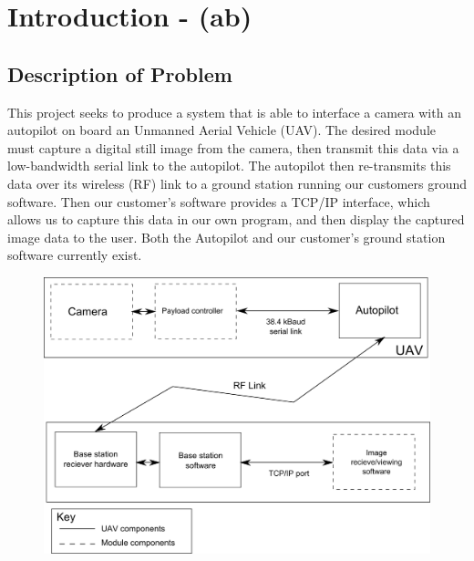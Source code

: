 \chapter{Introduction - (ab)}

\section{Description of Problem}

This project seeks to produce a system that is able to interface a camera with an autopilot on board an Unmanned Aerial Vehicle (UAV). The desired module must capture a digital still image from the camera, then transmit this data via a low-bandwidth serial link to the autopilot. The autopilot then re-transmits this data over its wireless (RF) link to a ground station running our customers ground software. Then our customer's software provides a TCP/IP interface, which allows us to capture this data in our own program, and then display the captured image data to the user. Both the Autopilot and our customer's ground station software currently exist.

\begin{figure}[H]
        \centering
        \includegraphics[width=1.00\textwidth]{figures/spec_block_diagram_2.png}
        \label{fig:blockDiagram}
\end{figure}

